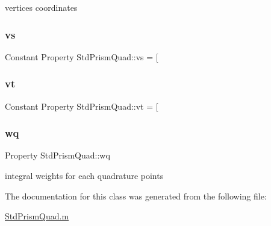 vertices coordinates 

\mbox{\label{class_std_prism_quad_a399d0136b948c7a3c9fcc915e6274f29}} 
\subsubsection{\texorpdfstring{vs}{vs}}
{\footnotesize\ttfamily Constant Property Std\+Prism\+Quad\+::vs = \mbox{[}}

\mbox{\label{class_std_prism_quad_aca67d5344c1a409f83fc41ecef6f810d}} 
\subsubsection{\texorpdfstring{vt}{vt}}
{\footnotesize\ttfamily Constant Property Std\+Prism\+Quad\+::vt = \mbox{[}}

\mbox{\label{class_std_prism_quad_abceb74ec7c8fedbd0c59d9f755e8ecfc}} 
\subsubsection{\texorpdfstring{wq}{wq}}
{\footnotesize\ttfamily Property Std\+Prism\+Quad\+::wq\hspace{0.3cm}{\ttfamily [protected]}}



integral weights for each quadrature points 



The documentation for this class was generated from the following file\+:\begin{DoxyCompactItemize}
\item 
\hyperlink{_std_prism_quad_8m}{Std\+Prism\+Quad.\+m}\end{DoxyCompactItemize}
